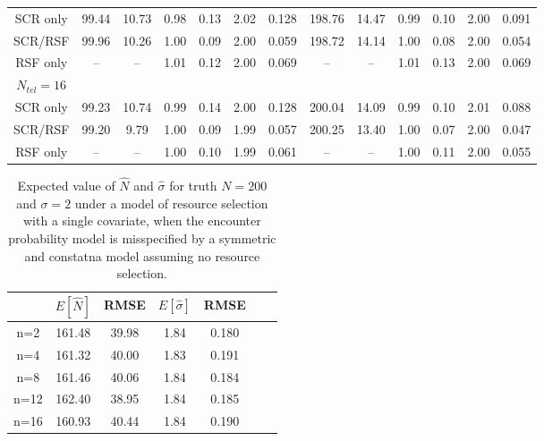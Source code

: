 \documentclass[12pt]{article}
\begin{document}
\begin{table}
\begin{tabular}{ccccccccccccc}
SCR only  &  99.44 &10.73 & 0.98 & 0.13 & 2.02&  0.128& 198.76& 14.47& 0.99&   0.10& 2.00&   0.091\\
SCR/RSF   &  99.96 &10.26 & 1.00 & 0.09 & 2.00&  0.059& 198.72& 14.14& 1.00&   0.08& 2.00&   0.054\\
RSF only  &   --   & --   & 1.01 & 0.12 & 2.00&  0.069&   --  &  --  & 1.01&   0.13& 2.00&   0.069\\
$N_{tel}=16$&        &      &      &     &     &       &       &      &     &       &       &      \\
SCR only  &  99.23 &10.74 & 0.99 & 0.14 & 2.00&  0.128& 200.04& 14.09&0.99&   0.10& 2.01&   0.088  \\
SCR/RSF   &  99.20 & 9.79 & 1.00 & 0.09 & 1.99&  0.057& 200.25& 13.40&1.00&   0.07& 2.00&   0.047 \\
RSF only  &   --   & --   & 1.00 & 0.10 & 1.99&  0.061&   --  &  --  &1.00&   0.11& 2.00&   0.055 \\
\end{tabular}
\label{tab.results1}
\end{table}



\begin{table}
\centering
\caption{Expected value of $\hat{N}$ and $\hat{\sigma}$
 for truth
  $N=200$ and $\sigma=2$ under a model of resource selection with a
  single covariate, when the
encounter probability model is misspecified by a symmetric and
constatna model assuming no resource selection.
}
\begin{tabular}{ccccccc}
\hline \hline
    &   $E[\hat{N}]$ & RMSE & $E[\hat{\sigma}]$ & RMSE \\  \hline
n=2 &     161.48  & 39.98  & 1.84 &  0.180  \\
n=4 &     161.32  &40.00  & 1.83 &  0.191 \\
n=8 &     161.46  &40.06  & 1.84 &  0.184 \\
n=12 &    162.40  &38.95  & 1.84 &  0.185\\
n=16 &    160.93  &40.44  & 1.84 &  0.190 \\
\end{tabular}
\label{tab.bias}
\end{table}
\end{document}
